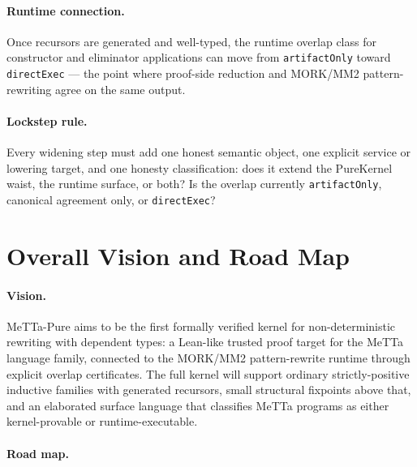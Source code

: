 \documentclass[11pt]{article}
\theoremstyle{remark}
\newcommand{\MeTTa}{\textup{MeTTa}}
\newcommand{\MORK}{\textup{MORK}}
\newcommand{\code}[1]{\texttt{#1}}
\begin{document}
\paragraph{Runtime connection.}
Once recursors are generated and well-typed, the runtime overlap class for
constructor and eliminator applications can move from
\code{artifactOnly} toward \code{directExec} --- the point where proof-side
reduction and MORK/MM2 pattern-rewriting agree on the same output.

\paragraph{Lockstep rule.}
Every widening step must add one honest semantic object, one explicit service
or lowering target, and one honesty classification: does it extend the
PureKernel waist, the runtime surface, or both? Is the overlap currently
\code{artifactOnly}, canonical agreement only, or \code{directExec}?

\section{Overall Vision and Road Map}
\label{sec:vision}

\paragraph{Vision.}
\MeTTa-Pure aims to be the first formally verified kernel for
non-deterministic rewriting with dependent types: a Lean-like trusted proof
target for the MeTTa language family, connected to the \MORK{}/MM2 pattern-rewrite
runtime through explicit overlap certificates.
The full kernel will support ordinary strictly-positive inductive families
with generated recursors, small structural fixpoints above that, and an
elaborated surface language that classifies \MeTTa{} programs as either
kernel-provable or runtime-executable.

\paragraph{Road map.}
\end{document}
